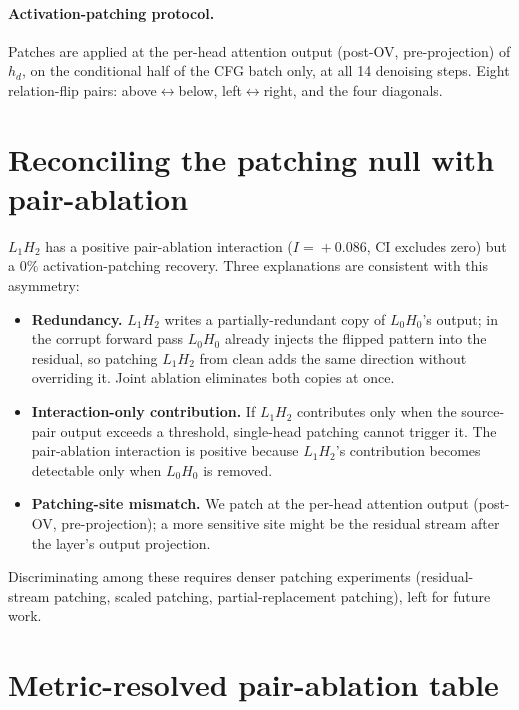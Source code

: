 \documentclass{article}
\begin{document}
\paragraph{Activation-patching protocol.} Patches are applied at the per-head attention output (post-OV, pre-projection) of $h_d$, on the conditional half of the CFG batch only, at all 14 denoising steps. Eight relation-flip pairs: above$\leftrightarrow$below, left$\leftrightarrow$right, and the four diagonals.

\section{Reconciling the patching null with pair-ablation}
\label{app:patching-null}

$L_1H_2$ has a positive pair-ablation interaction ($I\!=\!+0.086$, CI excludes zero) but a $0\%$ activation-patching recovery. Three explanations are consistent with this asymmetry:
\begin{itemize}
\item \textbf{Redundancy.} $L_1H_2$ writes a partially-redundant copy of $L_0H_0$'s output; in the corrupt forward pass $L_0H_0$ already injects the flipped pattern into the residual, so patching $L_1H_2$ from clean adds the same direction without overriding it. Joint ablation eliminates both copies at once.
\item \textbf{Interaction-only contribution.} If $L_1H_2$ contributes only when the source-pair output exceeds a threshold, single-head patching cannot trigger it. The pair-ablation interaction is positive because $L_1H_2$'s contribution becomes detectable only when $L_0H_0$ is removed.
\item \textbf{Patching-site mismatch.} We patch at the per-head attention output (post-OV, pre-projection); a more sensitive site might be the residual stream after the layer's output projection.
\end{itemize}
Discriminating among these requires denser patching experiments (residual-stream patching, scaled patching, partial-replacement patching), left for future work.

\section{Metric-resolved pair-ablation table}
\label{app:metric-pairs}
\end{document}
